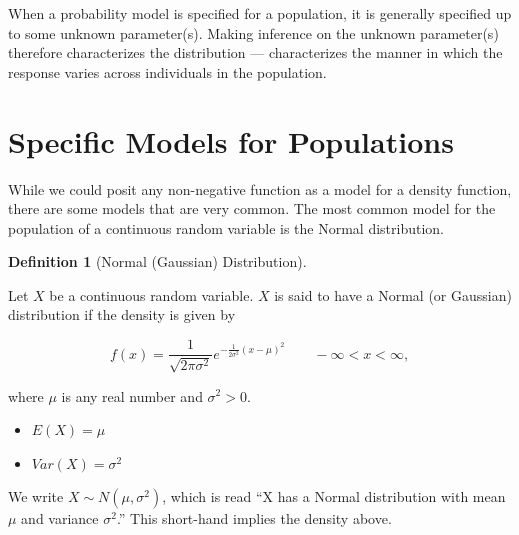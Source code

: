 \documentclass[
  letterpaper,
  DIV=11,
  numbers=noendperiod]{scrreprt}
\providecommand{\tightlist}{%
  \setlength{\itemsep}{0pt}\setlength{\parskip}{0pt}}\usepackage{longtable,booktabs,array}
\theoremstyle{definition}
\theoremstyle{definition}
\newtheorem{definition}{Definition}[chapter]
\theoremstyle{remark}
\begin{document}
\begin{tcolorbox}[enhanced jigsaw, bottomrule=.15mm, titlerule=0mm, bottomtitle=1mm, colback=white, coltitle=black, rightrule=.15mm, leftrule=.75mm, toprule=.15mm, toptitle=1mm, left=2mm, opacityback=0, colframe=quarto-callout-tip-color-frame, breakable, title=\textcolor{quarto-callout-tip-color}{\faLightbulb}\hspace{0.5em}{Big Idea}, arc=.35mm, colbacktitle=quarto-callout-tip-color!10!white, opacitybacktitle=0.6]

When a probability model is specified for a population, it is generally
specified up to some unknown parameter(s). Making inference on the
unknown parameter(s) therefore characterizes the distribution ---
characterizes the manner in which the response varies across individuals
in the population.

\end{tcolorbox}

\hypertarget{specific-models-for-populations}{%
\section{Specific Models for
Populations}\label{specific-models-for-populations}}

While we could posit any non-negative function as a model for a density
function, there are some models that are very common. The most common
model for the population of a continuous random variable is the Normal
distribution.

\begin{definition}[Normal (Gaussian)
Distribution]\protect\hypertarget{def-normal-distribution}{}\label{def-normal-distribution}

Let \(X\) be a continuous random variable. \(X\) is said to have a
Normal (or Gaussian) distribution if the density is given by

\[f(x) = \frac{1}{\sqrt{2 \pi \sigma^2}} e^{-\frac{1}{2\sigma^2} (x - \mu)^2} \qquad -\infty < x < \infty,\]

where \(\mu\) is any real number and \(\sigma^2 > 0\).

\begin{itemize}
\tightlist
\item
  \(E(X) = \mu\)
\item
  \(Var(X) = \sigma^2\)
\end{itemize}

We write \(X \sim N\left(\mu, \sigma^2\right)\), which is read ``X has a
Normal distribution with mean \(\mu\) and variance \(\sigma^2\).'' This
short-hand implies the density above.

\end{definition}
\end{document}
